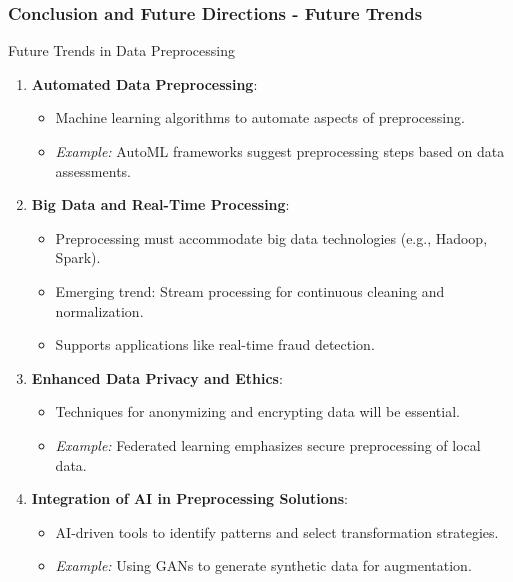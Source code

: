 \documentclass[aspectratio=169]{beamer}
\begin{document}
\begin{frame}[fragile]
    \frametitle{Conclusion and Future Directions - Future Trends}
    \begin{block}{Future Trends in Data Preprocessing}
        \begin{enumerate}
            \item \textbf{Automated Data Preprocessing}:
            \begin{itemize}
                \item Machine learning algorithms to automate aspects of preprocessing.
                \item \textit{Example:} AutoML frameworks suggest preprocessing steps based on data assessments.
            \end{itemize}

            \item \textbf{Big Data and Real-Time Processing}:
            \begin{itemize}
                \item Preprocessing must accommodate big data technologies (e.g., Hadoop, Spark).
                \item Emerging trend: Stream processing for continuous cleaning and normalization.
                \item Supports applications like real-time fraud detection.
            \end{itemize}

            \item \textbf{Enhanced Data Privacy and Ethics}:
            \begin{itemize}
                \item Techniques for anonymizing and encrypting data will be essential.
                \item \textit{Example:} Federated learning emphasizes secure preprocessing of local data.
            \end{itemize}

            \item \textbf{Integration of AI in Preprocessing Solutions}:
            \begin{itemize}
                \item AI-driven tools to identify patterns and select transformation strategies.
                \item \textit{Example:} Using GANs to generate synthetic data for augmentation.
            \end{itemize}
        \end{enumerate}
    \end{block}
\end{frame}
\end{document}
